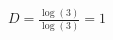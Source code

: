 \documentclass[preview]{standalone}
\begin{document}
\begin{align*}
D = \frac{\log(3)}{\log(3)} = 1
\end{align*}
\end{document}
